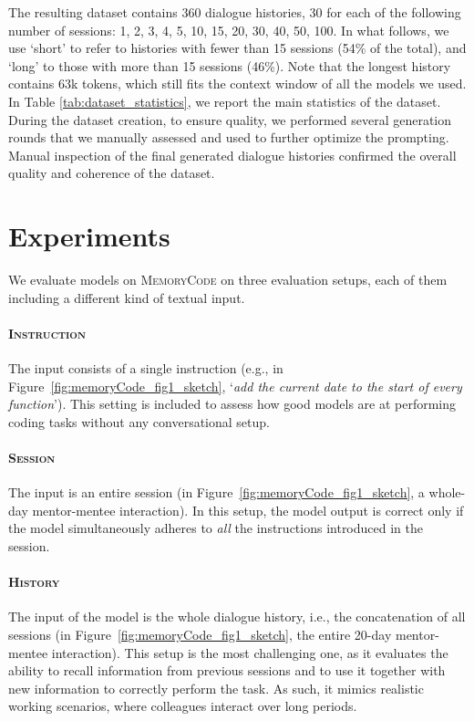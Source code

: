 The resulting dataset contains 360 dialogue histories, 30 for each of the following number of sessions: 1, 2, 3, 4, 5, 10, 15, 20, 30, 40, 50, 100.
In what follows, we use `short' to refer to histories with fewer than 15 sessions (54\% of the total), and `long' to those with more than 15 sessions (46\%). Note that the longest history contains 63k tokens, which still fits the context window of all the models we used.
In Table \ref{tab:dataset_statistics}, we report the main statistics of the dataset. 
During the dataset creation, to ensure quality, we performed several generation rounds that we manually assessed and used to further optimize the prompting. Manual inspection of the final generated dialogue histories confirmed the overall quality and coherence of the dataset.

\section{Experiments}
\label{subsec:experiments}




We evaluate models on \textsc{MemoryCode} on three evaluation setups, each of them including a different kind of textual input. 


\paragraph{\textsc{Instruction}} The input consists of a single instruction (e.g., in Figure~\ref{fig:memoryCode_fig1_sketch}, `\textit{add the current date to the start of every function}'). This setting is included to assess how good models are at performing coding tasks without any conversational setup.

\paragraph{\textsc{Session}} The input is an entire session (in Figure~\ref{fig:memoryCode_fig1_sketch}, a whole-day mentor-mentee interaction). 
In this setup, the model output is correct only if the model simultaneously adheres to \textit{all} the instructions introduced in the session.

\paragraph{\textsc{History}} The input of the model is the whole dialogue history, i.e., the concatenation of all sessions (in Figure~\ref{fig:memoryCode_fig1_sketch}, the entire 20-day mentor-mentee interaction). This setup is the most challenging one,
as it evaluates the ability to recall information from previous sessions and to use it together with new information to correctly perform the task. As such, it 
mimics realistic working scenarios, where colleagues interact over long periods.\\
    


